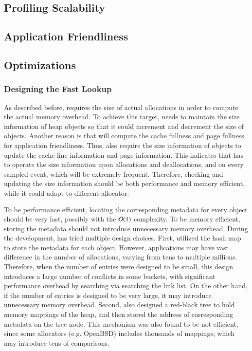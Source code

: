 \subsection{Profiling Scalability}

\subsection{Application Friendliness}

\subsection{Optimizations}

\subsubsection{Designing the Fast Lookup}

\label{sec:fastlookup}

As described before, \MP{} requires the size of actual allocations in order to compute the actual memory overhead. To achieve this target, \MP{} needs to maintain the size information of heap objects so that it could increment and decrement the size of objects. Another reason is that \MP{} will compute the cache fullness and page fullness for application friendliness. Thus, \MP{} also require the size information of objects to update the cache line information and page information. This indicates that \MP{} has to operate the size information upon allocations and deallocations, and on every sampled event, which will be extremely frequent. Therefore, checking and updating the size information should be both performance and memory efficient, while it could adapt to different allocator. 

To be performance efficient, locating the corresponding metadata for every object should be very fast, possibly with the $\mathcal{O}(1)$ complexity.  To be memory efficient, storing the metadata should not introduce unnecessary memory overhead. During the development, \MP{} has tried multiple design choices. First, \MP{} utilized the hash map to store the metadata for each object. However, applications may have vast difference in the number of allocations, varying from tens to multiple millions. Therefore, when the number of entries were designed to be small, this design introduces a large number of conflicts in some buckets, with significant performance overhead by searching via searching the link list. On the other hand, if the number of entries is designed to be very large, it may introduce unnecessary memory overhead. Second, \MP{} also designed a red-black tree to hold memory mappings of the heap, and then stored the address of corresponding metadata on the tree node. This mechanism was also found to be not efficient, since some allocators (e.g. OpenBSD)  includes thousands of mappings, which may introduce tens of comparisons. 

